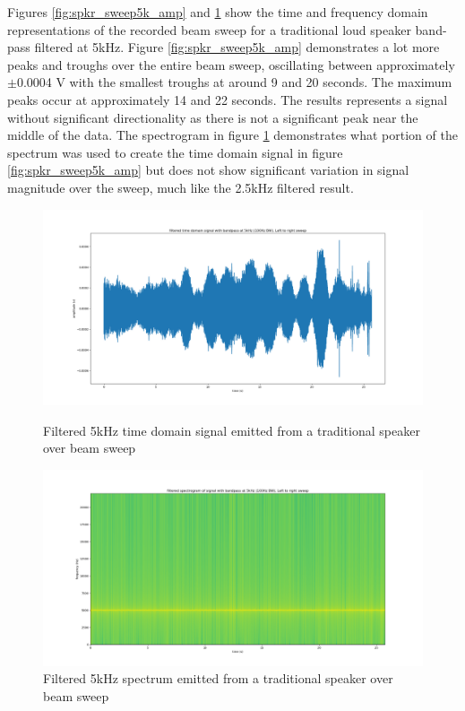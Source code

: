 Figures \ref{fig:spkr_sweep5k_amp} and \ref{fig:spkr_sweep5k_spectro} show the time and frequency domain representations of the recorded beam sweep for a traditional loud speaker band-pass filtered at 5kHz. Figure \ref{fig:spkr_sweep5k_amp} demonstrates a lot more peaks and troughs over the entire beam sweep, oscillating between approximately $\pm$0.0004 V with the smallest troughs at around 9 and 20 seconds. The maximum peaks occur at approximately 14 and 22 seconds. The results represents a signal without significant directionality as there is not a significant peak near the middle of the data. The spectrogram in figure \ref{fig:spkr_sweep5k_spectro} demonstrates what portion of the spectrum was used to create the time domain signal in figure \ref{fig:spkr_sweep5k_amp} but does not show significant variation in signal magnitude over the sweep, much like the 2.5kHz filtered result.
\begin{figure}[ht!]
    \centering
    \begin{minipage}{0.49\textwidth}
        \centering
        \includegraphics[width=\textwidth]{Figures/Testing/BeamSweep/Classical_speaker/5k_amp_sweep_spkr.png}
        \caption{Filtered 5kHz time domain signal emitted from a traditional speaker over beam sweep}
        \label{fig:spkr_sweep5k_amp}
    \end{minipage}\hfill
    \begin{minipage}{0.49\textwidth}
        \centering
        \includegraphics[width=\textwidth]{Figures/Testing/BeamSweep/Classical_speaker/5k_freq_sweep_spkr.png}
        \caption{Filtered 5kHz spectrum emitted from a traditional speaker over beam sweep}
        \label{fig:spkr_sweep5k_spectro}
    \end{minipage}
\end{figure}

